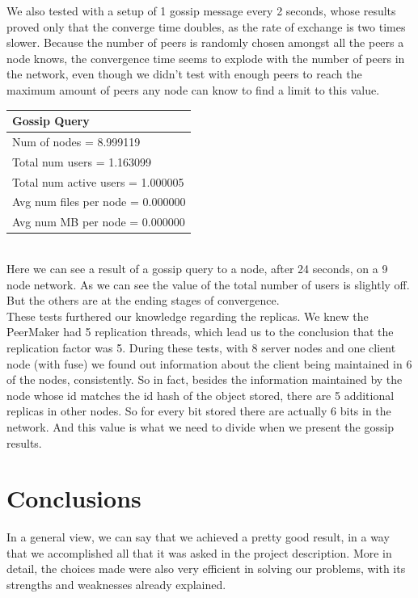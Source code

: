\documentclass[times,9pt,article]{llncs}
\begin{document}
We also tested with a setup of 1 gossip message every 2 seconds, whose results proved only that the converge time doubles, as the rate of exchange is two times slower.
Because the number of peers is randomly chosen amongst all the peers a node knows, the convergence time seems to explode with the number of peers in the network, even though we didn't test with enough peers to reach the maximum amount of peers any node can know to find a limit to this value.\\
\begin{tabular}{l}
  \hline  
  \textbf{Gossip Query} \\ \hline             
  Num of nodes = 8.999119 \\
  Total num users = 1.163099 \\
  Total num active users = 1.000005 \\
  Avg num files per node = 0.000000 \\
  Avg num MB per node = 0.000000 \\
  \hline  
\end{tabular}\\
Here we can see a result of a gossip query to a node, after 24 seconds, on a 9 node network.
As we can see the value of the total number of users is slightly off. But the others are at
the ending stages of convergence.\\
These tests furthered our knowledge regarding the replicas. We knew the PeerMaker had 5 replication threads, which lead us to the conclusion that the replication factor was 5. During these tests, with 8 server nodes and one client node (with fuse) we found out information about the client being maintained in 6 of the nodes, consistently. So in fact, besides the information maintained by the node whose id matches the id hash of the object stored, there are 5 additional replicas in other nodes. So for every bit stored there are actually 6 bits in the network. And this value is what we need to divide when we present the gossip results.



\section{Conclusions}
In a general view, we can say that we achieved a pretty good result, in a way that we accomplished all that it was asked in the project description.
More in detail, the choices made were also very efficient in solving our problems, with its strengths and weaknesses already explained.
\end{document}
